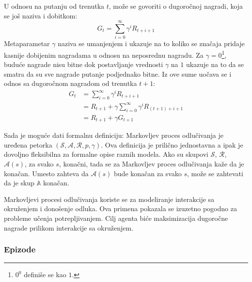 U odnosu na putanju od trenutka $t$, može se govoriti o dugoročnoj nagradi, koja se još naziva i dobitkom:
\begin{equation}
\label{eq:dug_suma}
	G_t = \sum_{i=0}^{\infty} \gamma^iR_{t+i+1}
\end{equation}
Metaparametar $\gamma$ naziva se umanjenjem i ukazuje na to koliko se značaja pridaje kasnije dobijenim nagradama u odnosu na neposrednu nagradu. Za $\gamma = 0$\footnote{$0^0$ definiše se kao $1$.}, buduće nagrade nisu bitne dok postavljanje vrednosti $\gamma$ na $1$ ukazuje na to da se smatra da su sve nagrade putanje podjednako bitne. Iz ove sume uočava se i odnos sa dugoročnom nagradom od trenutka $t+1$:
\begin{equation}
	\begin{aligned}
		G_t &= \sum_{i=0}^{\infty} \gamma^iR_{t+i+1} \\
        	&= R_{t+1} + \gamma\sum_{i=0}^{\infty} \gamma^iR_{(t+1)+i+1} \\
        	&=R_{t+1} + \gamma G_{t+1}
	\end{aligned}
\end{equation}
\par 
Sada je moguće dati formalnu definiciju: Markovljev proces odlučivanja je uređena petorka $(\mathcal{S}, \mathcal{A}, \mathcal{R}, p, \gamma)$. Ova definicija je prilično jednostavna a ipak je dovoljno fleksibilna za formalne opise raznih modela. Ako su skupovi $\mathcal{S}$, $\mathcal{R}$, $\mathcal{A}(s)$, za svako $s$, konačni, tada se za Markovljev proces odlučivanja kaže da je konačan. Umesto zahteva da $\mathcal{A}(s)$ bude konačan za svako $s$, može se zahtevati da je skup $\mathbb{A}$ konačan.
\par 
Markovljevi procesi odlučivanja koriste se za modeliranje interakcije sa okruženjem i donošenje odluka. Ova primena pokazala se izuzetno pogodno za probleme učenja potrepljivanjem. Cilj agenta biće maksimizacija dugoročne nagrade prilikom interakcije sa okruženjem.


\subsubsection{Epizode}

